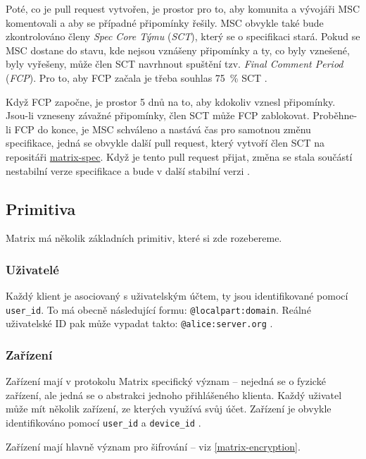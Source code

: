 Poté, co je pull request vytvořen, je prostor pro to, aby komunita a vývojáři MSC
komentovali a aby se případné připomínky řešily. MSC obvykle také bude
zkontrolováno členy \textit{Spec Core Týmu} (\textit{SCT}), který se o
specifikaci stará. Pokud se MSC dostane do stavu, kde nejsou vznášeny připomínky
a ty, co byly vznešené, byly vyřešeny, může člen SCT navrhnout spuštění tzv.
\textit{Final Comment Period} (\textit{FCP}). Pro to, aby FCP začala je třeba
souhlas 75~\% SCT \cite{MatrixORG-MSCs}.

Když FCP započne, je prostor 5 dnů na to, aby kdokoliv vznesl připomínky.
Jsou-li vzneseny závažné připomínky, člen SCT může FCP zablokovat. Proběhne-li
FCP do konce, je MSC schváleno a nastává čas pro samotnou změnu specifikace,
jedná se obvykle další pull request, který vytvoří člen SCT na repositáři
\href{https://github.com/matrix-org/matrix-spec}{matrix-spec}. Když
je tento pull request přijat, změna se stala součástí nestabilní verze
specifikace a bude v další stabilní verzi \cite{MatrixORG-MSCs}.

\subsection{Primitiva}

Matrix má několik základních primitiv, které si zde rozebereme.

\subsubsection{Uživatelé}

Každý klient je asociovaný s uživatelským účtem, ty jsou identifikované pomocí
\texttt{user_id}. To má obecně následující formu:
\texttt{@localpart:domain}. Reálné uživatelské ID pak může vypadat
takto: \texttt{@alice:server.org} \cite{MatrixORG-Spec}.

\subsubsection{Zařízení}

Zařízení mají v protokolu Matrix specifický význam -- nejedná se o fyzické
zařízení, ale jedná se o abstrakci jednoho přihlášeného klienta. Každý uživatel
může mít několik zařízení, ze kterých využívá svůj účet. Zařízení je obvykle
identifikováno pomocí \texttt{user_id} a \texttt{device_id}
\cite{MatrixORG-Spec}.

Zařízení mají hlavně význam pro šifrování -- viz \ref{matrix-encryption}.

